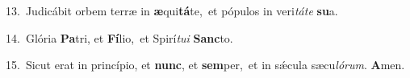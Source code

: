 {\numbfont\textcolor{\numbcolor}{13.}}~Judicábit orbem terræ in \textbf{æ}\-qui\-\textbf{tá}\-te,~\star et pópulos in veri\-\textit{tá}\-\textit{te} \textbf{su}\-a.\par
{\numbfont\textcolor{\numbcolor}{14.}}~Glória \textbf{Pa}\-tri, et \textbf{Fí}\-lio,~\star et Spirí\-\textit{tu}\-\textit{i} \textbf{Sanc}\-to.\par
{\numbfont\textcolor{\numbcolor}{15.}}~Sicut erat in princípio, et \textbf{nunc}\-, et \textbf{sem}\-per,~\star et in sǽcula sæcu\-\textit{ló}\-\textit{rum}. \textbf{A}\-men.\par
